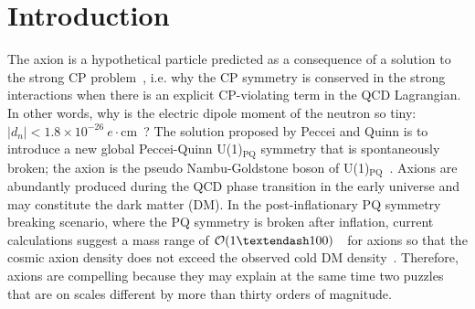 \section{Introduction} \label{sec:intro}
The axion is a hypothetical particle predicted as a consequence of a  
solution to the strong CP problem~\cite{strongCPI,strongCPII,strongCPIII}, 
i.e. why the CP symmetry is conserved in the strong 
interactions when there is an explicit CP-violating term in the QCD 
Lagrangian. In other words, why is the electric dipole moment 
of the neutron so tiny:  
$\left|d_n\right| < 1.8 \times10^{-26}~e\cdot\mathrm{cm}$~\cite{EDM,PDG}? 
The solution proposed by Peccei and Quinn is to introduce a new global 
Peccei-Quinn U(1)$_\mathrm{PQ}$ symmetry that is spontaneously broken; the 
axion is the pseudo Nambu-Goldstone boson of 
U(1)$_\mathrm{PQ}$~\cite{strongCPI}. 
Axions are abundantly produced during the QCD phase transition in 
the early universe and may constitute the dark matter (DM). 
In the post-inflationary PQ symmetry breaking scenario, where the PQ symmetry
is broken after inflation, current calculations suggest a mass range of 
${\cal O}(1–100)$~\muevcc\ for axions so that the cosmic axion density does 
not exceed the 
observed cold DM density~\cite{QCDCalI,QCDCalII,QCDCalIII,QCDCalIV,QCDCalV,QCDCalVI,QCDCalVII,QCDCalVIII,QCDCalIX,QCDCalX,QCDCalXI,QCDCalXII,QCDCalXIII}. 
Therefore, axions are compelling because they may explain at the same 
time two puzzles that are on scales different by more than thirty orders of 
magnitude. 


%
%
%

%
%
%

